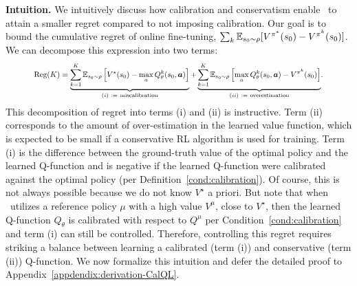 
{\textbf{Intuition.}} We intuitively discuss how calibration and conservatism enable \methodname\ to attain a smaller regret compared to not imposing calibration. Our goal is to bound the cumulative regret of online fine-tuning, ${\sum_{k} \mathbb{E}_{s_0 \sim \rho}[V^{\pi^\star}(s_0) - V^{\pi^k}(s_0)]}$. We can decompose this expression into two terms: 
\vspace{-0.05cm}
\begin{align}
    \resizebox{.87\textwidth}{!}{$\regret(K) = \underbrace{\sum_{k=1}^K \mathbb{E}_{\bs_0 \sim \rho} \brac{V^{\star}(\bs_0) -\max_a {Q}_{\theta}^k(\bs_0,\mathbf{a})}}_{(i) ~:=~ \text{miscalibration}}
    +\underbrace{\sum_{k=1}^K \mathbb{E}_{\bs_0 \sim \rho} \brac{ \max_a {Q}_{\theta}^k(\bs_0,\mathbf{a}) - V^{\pi^{k}}(\bs_0)}}_{(ii) ~:=~ \text{overestimation}}$.}
\label{eq:regret-decomposition}
\end{align}
This decomposition of regret into terms (i) and (ii) is instructive. Term (ii) corresponds to the amount of over-estimation in the learned value function, which is expected to be small if a conservative RL algorithm is used for training. Term (i) is the difference between the ground-truth value of the optimal policy and the learned Q-function and is negative if the learned Q-function were calibrated against the optimal policy (per Definition~\ref{cond:calibration}). Of course, this is not always possible because we do not know $V^\star$ a priori. But note that when \methodname\ utilizes a reference policy $\mu$ with a high value $V^\mu$, close to $V^\star$, then the learned Q-function $Q_\theta$ is calibrated with respect to $Q^\mu$ per Condition~\ref{cond:calibration} and term (i) can still be controlled. Therefore, controlling this regret requires striking a balance between learning a calibrated (term (i)) and conservative (term (ii)) Q-function. We now formalize this intuition and defer the detailed proof to Appendix~\ref{appdendix:derivation-CalQL}. 


